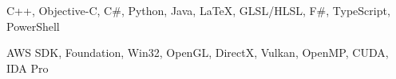 \begin{cvskills}
	{C++, Objective-C, C\#, Python, Java, \LaTeX{}, GLSL/HLSL, F\#, TypeScript, PowerShell} %


	{AWS SDK, Foundation, Win32, OpenGL, DirectX, Vulkan, OpenMP, CUDA, IDA Pro} %

\end{cvskills}
